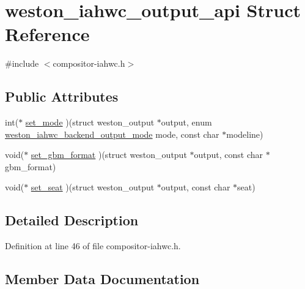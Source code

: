 \hypertarget{structweston__iahwc__output__api}{}\section{weston\+\_\+iahwc\+\_\+output\+\_\+api Struct Reference}
\label{structweston__iahwc__output__api}


{\ttfamily \#include $<$compositor-\/iahwc.\+h$>$}

\subsection*{Public Attributes}
\begin{DoxyCompactItemize}
\item 
int($\ast$ \mbox{\hyperlink{structweston__iahwc__output__api_a1b41645a52bae88cef5a7d8706995483}{set\+\_\+mode}} )(struct weston\+\_\+output $\ast$output, enum \mbox{\hyperlink{compositor-iahwc_8h_a992bc1439aa5a0996040fdde612744e1}{weston\+\_\+iahwc\+\_\+backend\+\_\+output\+\_\+mode}} mode, const char $\ast$modeline)
\item 
void($\ast$ \mbox{\hyperlink{structweston__iahwc__output__api_ae1d4658d13aa96318374dd5e9f1e2044}{set\+\_\+gbm\+\_\+format}} )(struct weston\+\_\+output $\ast$output, const char $\ast$gbm\+\_\+format)
\item 
void($\ast$ \mbox{\hyperlink{structweston__iahwc__output__api_a9338e2a3accee27c1ea4b09e5b2ce8bd}{set\+\_\+seat}} )(struct weston\+\_\+output $\ast$output, const char $\ast$seat)
\end{DoxyCompactItemize}


\subsection{Detailed Description}


Definition at line 46 of file compositor-\/iahwc.\+h.



\subsection{Member Data Documentation}
\mbox{\label{structweston__iahwc__output__api_ae1d4658d13aa96318374dd5e9f1e2044}} 
